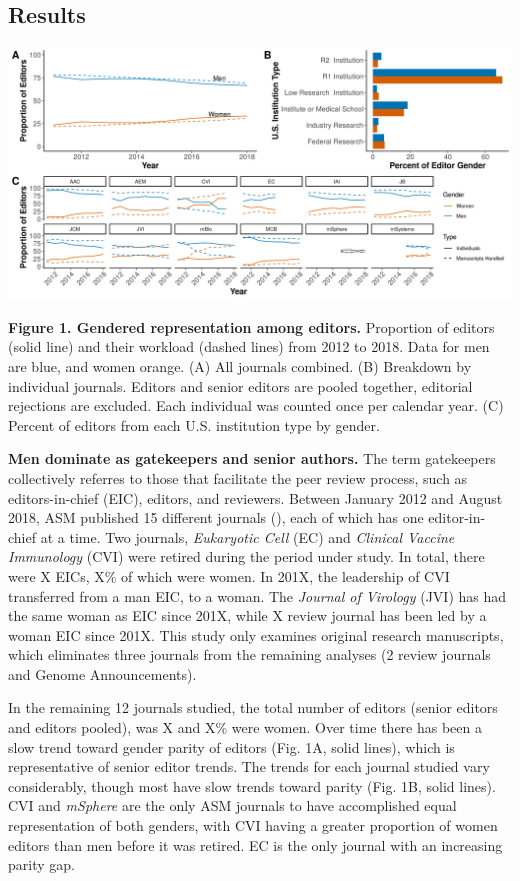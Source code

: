 \documentclass[11pt,]{article}
\begin{document}
\subsection{Results}\label{results}

\includegraphics{Figure_1.png}

\textbf{Figure 1. Gendered representation among editors.} Proportion of
editors (solid line) and their workload (dashed lines) from 2012 to
2018. Data for men are blue, and women orange. (A) All journals
combined. (B) Breakdown by individual journals. Editors and senior
editors are pooled together, editorial rejections are excluded. Each
individual was counted once per calendar year. (C) Percent of editors
from each U.S. institution type by gender.

\textbf{Men dominate as gatekeepers and senior authors.} The term
gatekeepers collectively referres to those that facilitate the peer
review process, such as editors-in-chief (EIC), editors, and reviewers.
Between January 2012 and August 2018, ASM published 15 different
journals (), each of which has one editor-in-chief at a time. Two
journals, \emph{Eukaryotic Cell} (EC) and \emph{Clinical Vaccine
Immunology} (CVI) were retired during the period under study. In total,
there were X EICs, X\% of which were women. In 201X, the leadership of
CVI transferred from a man EIC, to a woman. The \emph{Journal of
Virology} (JVI) has had the same woman as EIC since 201X, while X review
journal has been led by a woman EIC since 201X. This study only examines
original research manuscripts, which eliminates three journals from the
remaining analyses (2 review journals and Genome Announcements).

In the remaining 12 journals studied, the total number of editors
(senior editors and editors pooled), was X and X\% were women. Over time
there has been a slow trend toward gender parity of editors (Fig. 1A,
solid lines), which is representative of senior editor trends. The
trends for each journal studied vary considerably, though most have slow
trends toward parity (Fig. 1B, solid lines). CVI and \emph{mSphere} are
the only ASM journals to have accomplished equal representation of both
genders, with CVI having a greater proportion of women editors than men
before it was retired. EC is the only journal with an increasing parity
gap.
\end{document}
